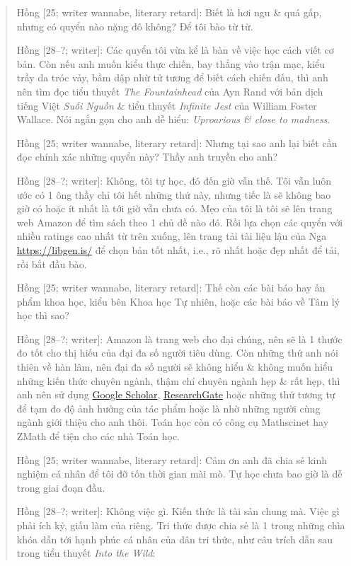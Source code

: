 \documentclass[12pt,twoside]{book}
\begin{document}
\begin{quote}
	{\sf Hồng [25; writer wannabe, literary retard]}: Biết là hơi ngu \& quá gấp, nhưng có quyển nào nặng đô không? Để tôi bào từ từ.
	
	{\sf Hồng [28--?; writer]}: Các quyển tôi vừa kể là bàn về việc học cách viết cơ bản. Còn nếu anh muốn kiểu thực chiến, bay thẳng vào trận mạc, kiểu trầy da tróc vảy, bầm dập nhừ tử tương để biết cách chiến đấu, thì anh nên tìm đọc tiểu thuyết {\it The Fountainhead} \cite{Rand_fountainhead} của {\sc Ayn Rand} với bản dịch tiếng Việt {\it Suối Nguồn} \cite{Rand_fountainhead_VN} \& tiểu thuyết {\it Infinite Jest} \cite{Wallace_jest} của {\sc William Foster Wallace}. Nói ngắn gọn cho anh dễ hiểu: {\it Uproarious \& close to madness}.
	
	{\sf Hồng [25; writer wannabe, literary retard]}: Nhưng tại sao anh lại biết cần đọc chính xác những quyển này? Thầy anh truyền cho anh?
	
	{\sf Hồng [28--?; writer]}: Không, tôi tự học, đó đến giờ vẫn thế. Tôi vẫn luôn ước có 1 ông thầy chỉ tôi hết những thứ này, nhưng tiếc là sẽ không bao giờ có hoặc ít nhất là tới giờ vẫn chưa có. Mẹo của tôi là tôi sẽ lên trang web Amazon để tìm sách theo 1 chủ đề nào đó. Rồi lựa chọn các quyển với nhiều ratings cao nhất từ trên xuống, lên trang tải tài liệu lậu của Nga \url{https://libgen.is/} để chọn bản tốt nhất, i.e., rõ nhất hoặc đẹp nhất để tải, rồi bắt đầu bào.
	
	{\sf Hồng [25; writer wannabe, literary retard]}: Thế còn các bài báo hay ấn phẩm khoa học, kiểu bên Khoa học Tự nhiên, hoặc các bài báo về Tâm lý học thì sao?
	
	{\sf Hồng [28--?; writer]}: Amazon là trang web cho đại chúng, nên sẽ là 1 thước đo tốt cho thị hiếu của đại đa số người tiêu dùng. Còn những thứ anh nói thiên về hàn lâm, nên đại đa số người sẽ không hiểu \& không muốn hiểu những kiến thức chuyên ngành, thậm chí chuyên ngành hẹp \& rất hẹp, thì anh nên sử dụng \href{https://scholar.google.com/}{Google Scholar}, \href{https://www.researchgate.net/}{ResearchGate} hoặc những thứ tương tự để tạm đo độ ảnh hưởng của tác phẩm hoặc là nhờ những người cùng ngành giới thiệu cho anh thôi. Toán học còn có công cụ Mathscinet hay ZMath để tiện cho các nhà Toán học.
	
	{\sf Hồng [25; writer wannabe, literary retard]}: Cảm ơn anh đã chia sẻ kinh nghiệm cá nhân để tôi đỡ tốn thời gian mài mò. Tự học chưa bao giờ là dễ trong giai đoạn đầu.
	
	{\sf Hồng [28--?; writer]}: Không việc gì. Kiến thức là tài sản chung mà. Việc gì phải ích kỷ, giấu làm của riêng. Tri thức được chia sẻ là 1 trong những chìa khóa dẫn tới hạnh phúc cá nhân của dân tri thức, như câu trích dẫn sau trong tiểu thuyết {\it Into the Wild}:
\end{quote}
\end{document}
